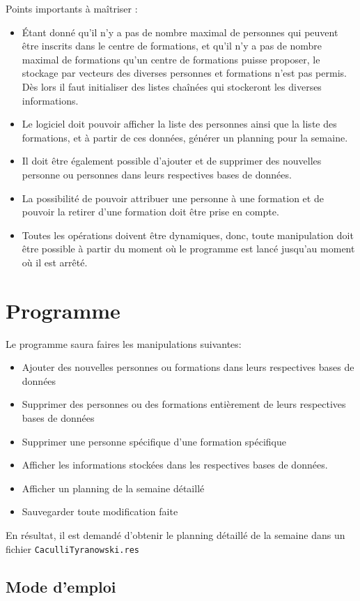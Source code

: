 \documentclass[11pt]{article}
\begin{document}
Points importants à maîtriser :
\begin{itemize}
\item Étant donné qu'il n'y a pas de nombre maximal de personnes qui peuvent être inscrits dans le centre de formations, et qu'il n'y a pas de nombre maximal de formations qu'un centre de formations puisse proposer, le stockage par vecteurs des diverses personnes et formations n'est pas permis. Dès lors il faut initialiser des listes chaînées qui stockeront les diverses informations.
\item Le logiciel doit pouvoir afficher la liste des personnes ainsi que la liste des formations, et à partir de ces données, générer un planning pour la semaine.
\item Il doit être également possible d'ajouter et de supprimer des nouvelles personne ou personnes dans leurs respectives bases de données.
\item La possibilité de pouvoir attribuer une personne à une formation et de pouvoir la retirer d'une formation doit être prise en compte.
\item Toutes les opérations doivent être dynamiques, donc, toute manipulation doit être possible à partir du moment où le programme est lancé jusqu'au moment où il est arrêté.
\end{itemize}

\newpage
\section{Programme}
Le programme saura faires les manipulations suivantes:
\begin{itemize}
\item Ajouter des nouvelles personnes ou formations dans leurs respectives bases de données
\item Supprimer des personnes ou des formations entièrement de leurs respectives bases de données
\item Supprimer une personne spécifique d'une formation spécifique
\item Afficher les informations stockées dans les respectives bases de données.
\item Afficher un planning de la semaine détaillé
\item Sauvegarder toute modification faite
\end{itemize}
En résultat, il est demandé d'obtenir le planning détaillé de la semaine dans un fichier \texttt{CaculliTyranowski.res}
\subsection{Mode d'emploi}
\end{document}

